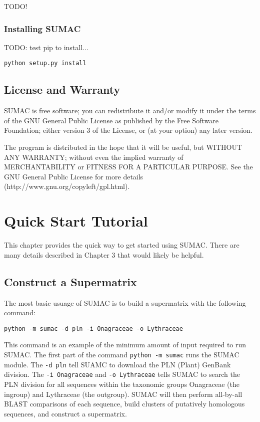 \documentclass[10pt]{report}
\begin{document}
TODO!

\subsection{Installing SUMAC}

TODO: test pip to install...

\begin{verbatim}
python setup.py install
\end{verbatim}

\section{License and Warranty}
SUMAC is free software; you can redistribute it and/or modify it under the terms of the GNU General Public License as published by the Free Software Foundation; either version 3 of the License, or (at your option) any later version.

The program is distributed in the hope that it will be useful, but WITHOUT ANY WARRANTY; without even the implied warranty of MERCHANTABILITY or FITNESS FOR A PARTICULAR PURPOSE. See the GNU General Public License for more details \\ (http://www.gnu.org/copyleft/gpl.html).


\chapter{Quick Start Tutorial}

This chapter provides the quick way to get started using SUMAC. 
There are many details described in Chapter 3 that
would likely be helpful.

\section{Construct a Supermatrix}

The most basic usuage of SUMAC is to build a supermatrix with the following
command:

\begin{verbatim}
python -m sumac -d pln -i Onagraceae -o Lythraceae
\end{verbatim}

This command is an example of the minimum amount of input required
to run SUMAC. The first part of the command \texttt{python -m sumac}
runs the SUMAC module. The \texttt{-d pln}
tell SUAMC to download the PLN (Plant) GenBank division. The
\texttt{-i Onagraceae} and \texttt{-o Lythraceae}
tells SUMAC to search the PLN division for all sequences within
the taxonomic groups Onagraceae (the ingroup) and Lythraceae (the outgroup).
SUMAC will then perform all-by-all BLAST comparisons of each sequence, 
build clusters of putatively homologous sequences, and 
construct a supermatrix. 
\end{document}
